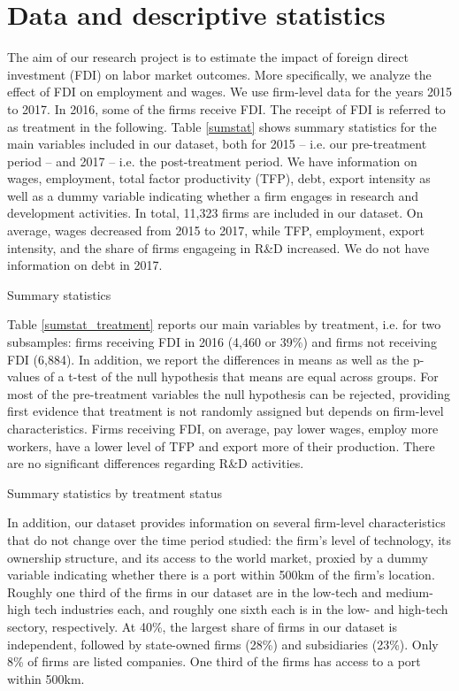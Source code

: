 \documentclass[11pt]{article}
\begin{document}
\section{Data and descriptive statistics}

The aim of our research project is to estimate the impact of foreign direct investment (FDI) on labor market outcomes. More specifically, we analyze the effect of FDI on employment and wages. We use firm-level data for the years 2015 to 2017. In 2016, some of the firms receive FDI. The receipt of FDI is referred to as treatment in the following. Table \ref{sumstat} shows summary statistics for the main variables included in our dataset, both for 2015 -- i.e. our pre-treatment period -- and 2017 -- i.e. the post-treatment  period. We have information on wages, employment, total factor productivity (TFP), debt, export intensity as well as a dummy variable indicating whether a firm engages in research and development activities. In total, 11,323 firms are included in our dataset. On average, wages decreased from 2015 to 2017, while TFP, employment, export intensity, and the share of firms engageing in R\&D  increased. We do not have information on debt in 2017.


\begin{table}[htbp]\centering \caption{Summary statistics\label{sumstat}}

 \end{table}


Table \ref{sumstat_treatment} reports our main variables by treatment, i.e. for two subsamples: firms receiving FDI in 2016 (4,460 or 39\%)  and firms not receiving FDI (6,884). In addition, we report the differences in means as well as the p-values of a t-test of the null hypothesis that means are equal across groups. For most of the pre-treatment variables the null hypothesis can be rejected, providing first evidence that treatment is not randomly assigned but depends on firm-level characteristics. Firms receiving FDI, on average, pay lower wages, employ more workers, have a lower level of TFP and export more of their production. There are no significant differences regarding R\&D activities. 

\begin{table}[htbp]\centering \caption{Summary statistics by treatment status\label{sumstat_treatment}}

\end{table} 


In addition, our dataset provides information on several firm-level characteristics that do not change over the time period studied: the firm's level of technology, its ownership structure, and its access to the world market, proxied by a dummy variable indicating whether there is a port within 500km of the firm's location. Roughly one third of the firms in our dataset are in the low-tech and medium-high tech industries each, and roughly one sixth each is in the low- and high-tech sectory, respectively. At 40\%, the largest share of firms in our dataset is independent, followed by state-owned firms (28\%) and subsidiaries (23\%). Only 8\% of firms are listed companies. One third of the firms has access to a port within 500km.
\end{document}
